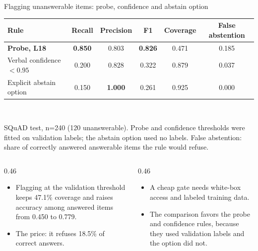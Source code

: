 \documentclass[aspectratio=169,11pt,usepdftitle=false]{beamer}
\begin{document}
\begin{frame}{Flagging unanswerable items: probe, confidence and abstain option}
\small
\centering
\setlength{\tabcolsep}{6pt}
\begin{tabular}{@{}lccccc@{}}
\toprule
Rule & Recall & Precision & F1 & Coverage & False abstention \\
\midrule
\textbf{Probe, L18} & \textbf{0.850} & 0.803 & \textbf{0.826} & 0.471 & 0.185 \\
Verbal confidence $<0.95$ & 0.200 & 0.828 & 0.322 & 0.879 & 0.037 \\
Explicit abstain option & 0.150 & \textbf{1.000} & 0.261 & 0.925 & 0.000 \\
\bottomrule
\end{tabular}\\[8pt]
{\scriptsize SQuAD test, n=240 (120 unanswerable). Probe and confidence thresholds were fitted on validation labels; the abstain option used no labels. False abstention: share of correctly answered answerable items the rule would refuse.\par}
\vspace{8pt}
\begin{columns}[T]
\begin{column}{0.46\textwidth}
\footnotesize
\begin{itemize}
\item Flagging at the validation threshold keeps 47.1\% coverage and raises accuracy among answered items from 0.450 to 0.779.
\item The price: it refuses 18.5\% of correct answers.
\end{itemize}
\end{column}
\begin{column}{0.46\textwidth}
\footnotesize
\begin{itemize}
\item A cheap gate needs white-box access and labeled training data.
\item The comparison favors the probe and confidence rules, because they used validation labels and the option did not.
\end{itemize}
\end{column}
\end{columns}
\end{frame}
\end{document}
